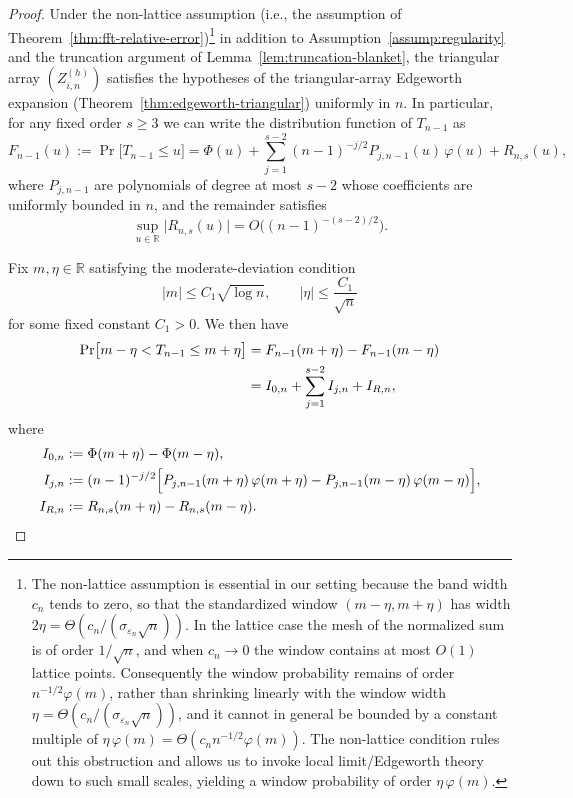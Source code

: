 \documentclass{article}
\theoremstyle{plain}
\theoremstyle{definition}
\begin{document}
\begin{proof}
Under the non-lattice assumption (i.e., the assumption of Theorem~\ref{thm:fft-relative-error})\footnote{The non-lattice assumption is essential in our setting because the band width $c_n$ tends to zero, so that the standardized window $(m-\eta,m+\eta)$ has width $2\eta = \Theta(c_n/(\sigma_{\varepsilon_n}\sqrt{n}))$. In the lattice case the mesh of the normalized sum is of order $1/\sqrt{n}$, and when $c_n\to0$ the window contains at most $O(1)$ lattice points. Consequently the window probability remains of order $n^{-1/2}\varphi(m)$, rather than shrinking linearly with the window width $\eta = \Theta(c_n/(\sigma_{\varepsilon_n}\sqrt{n}))$, and it cannot in general be bounded by a constant multiple of $\eta\,\varphi(m)=\Theta(c_n n^{-1/2}\varphi(m))$. The non-lattice condition rules out this obstruction and allows us to invoke local limit/Edgeworth theory down to such small scales, yielding a window probability of order $\eta\,\varphi(m)$.}
 in addition to Assumption~\ref{assump:regularity} and the truncation
argument of Lemma~\ref{lem:truncation-blanket}, the triangular array
$(Z_{i,n}^{(h)})$ satisfies the hypotheses of the triangular-array
Edgeworth expansion
(Theorem~\ref{thm:edgeworth-triangular}) uniformly in $n$.
In particular, for any fixed order $s\ge3$ we can write the distribution
function of $T_{n-1}$ as
\[
  F_{n-1}(u)
  := \Pr\bigl[T_{n-1}\le u\bigr]
  = \Phi(u)
    + \sum_{j=1}^{s-2}(n-1)^{-j/2}P_{j,n-1}(u)\,\varphi(u)
    + R_{n,s}(u),
\]
where $P_{j,n-1}$ are polynomials of degree at most $s-2$ whose
coefficients are uniformly bounded in $n$, and the remainder satisfies
\[
  \sup_{u\in\mathbb R}\bigl|R_{n,s}(u)\bigr|
  = O\bigl((n-1)^{-(s-2)/2}\bigr).
\]

Fix $m,\eta\in\mathbb R$ satisfying the moderate-deviation condition
\begin{equation}
  \label{eq:md-region}
  |m|\le C_1\sqrt{\log n},
  \qquad
  |\eta|\le \frac{C_1}{\sqrt{n}}
\end{equation}
for some fixed constant $C_1>0$.
We then have
\begin{align}
  \Pr\bigl[m-\eta < T_{n-1} \le m+\eta\bigr]
  &= F_{n-1}(m+\eta) - F_{n-1}(m-\eta)\notag\\
  &= I_{0,n} + \sum_{j=1}^{s-2} I_{j,n} + I_{R,n},
  \label{eq:window-decomp}
\end{align}
where
\begin{align*}
  I_{0,n}
  &:= \Phi(m+\eta) - \Phi(m-\eta),\\
  I_{j,n}
  &:= (n-1)^{-j/2}
      \Bigl[
        P_{j,n-1}(m+\eta)\,\varphi(m+\eta)
        - P_{j,n-1}(m-\eta)\,\varphi(m-\eta)
      \Bigr],\\
  I_{R,n}
  &:= R_{n,s}(m+\eta) - R_{n,s}(m-\eta).
\end{align*}


\end{proof}
\end{document}

